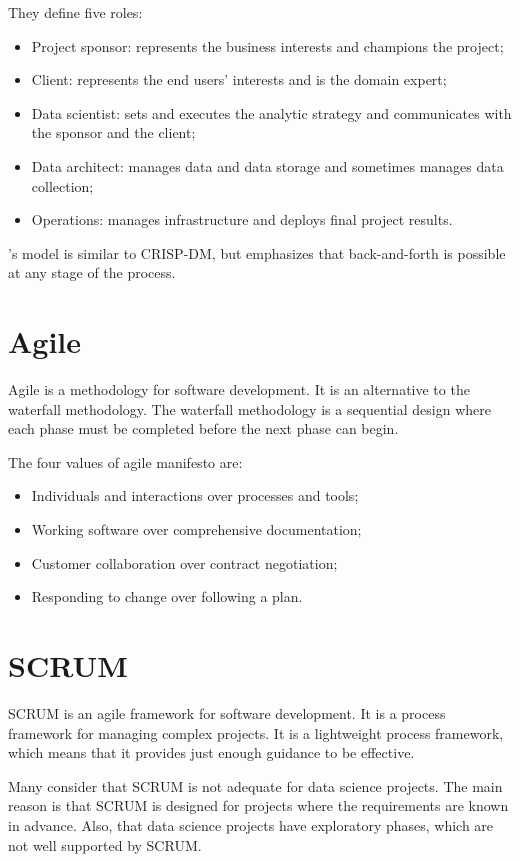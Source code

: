 They define five roles:
\begin{itemize}
  \item Project sponsor: represents the business interests and champions the project;
  \item Client: represents the end users’ interests and is the domain expert;
  \item Data scientist: sets and executes the analytic strategy and communicates with the
    sponsor and the client;
  \item Data architect: manages data and data storage and sometimes manages data
    collection;
  \item Operations: manages infrastructure and deploys final project results.
\end{itemize}

\citeauthor{Zumel2019}'s model is similar to CRISP-DM, but emphasizes that back-and-forth
is possible at any stage of the process.

\section{Agile}

Agile is a methodology for software development.  It is an alternative to the waterfall
methodology.  The waterfall methodology is a sequential design where each phase
must be completed before the next phase can begin.

The four values of agile manifesto are:
\begin{itemize}
  \item Individuals and interactions over processes and tools;
  \item Working software over comprehensive documentation;
  \item Customer collaboration over contract negotiation;
  \item Responding to change over following a plan.
\end{itemize}

\section{SCRUM}

SCRUM is an agile framework for software development.  It is a process framework for
managing complex projects.  It is a lightweight process framework, which means that it
provides just enough guidance to be effective.

Many consider that SCRUM is not adequate for data science projects.  The main reason is
that SCRUM is designed for projects where the requirements are known in advance.  Also,
that data science projects have exploratory phases, which are not well supported by SCRUM.

